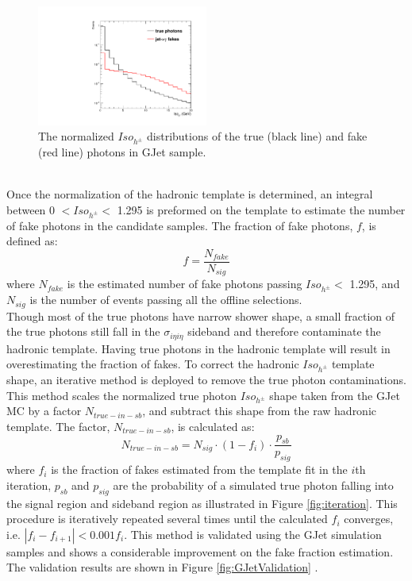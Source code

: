 \documentclass[thesis.tex]{subfiles}
\renewcommand\_{\textunderscore\allowbreak}
\begin{document}
\begin{figure}
  \centering
    \includegraphics[width=0.5\textwidth]{Figures/PLOT_JetPhoTemplate.pdf}
  \caption{The normalized $Iso_{h^\pm}$ distributions of the true (black line) and fake (red line) photons in GJet sample.}
    \label{fig:fakeinGJet}
\end{figure}
\\

Once the normalization of the hadronic template is determined, an integral between 0 $< Iso_{h^\pm} <$ 1.295 is preformed on the template to estimate the number of fake photons in the candidate samples. The fraction of fake photons, $f$, is defined as: 
\begin{equation}
		f = \frac{N_{fake}}{N_{sig}}
\end{equation}
where $N_{fake}$ is the estimated number of fake photons passing $Iso_{h^\pm} < $ 1.295, and $N_{sig}$ is the number of events passing all the offline selections. \\

Though most of the true photons have narrow shower shape, a small fraction of the true photons still fall in the $\sigma_{i\eta i\eta}$ sideband and therefore contaminate the hadronic template. Having true photons in the hadronic template will result in overestimating the fraction of fakes. To correct the hadronic $Iso_{h^\pm}$ template shape, an iterative method is deployed to remove the true photon contaminations.\\

This method scales the normalized true photon $Iso_{h^\pm}$ shape taken from the GJet MC by a factor $N_{true-in-sb}$, and subtract this shape from the raw hadronic template. The factor, $N_{true-in-sb}$,  is calculated as:
\begin{equation}
		N_{true-in-sb} = N_{sig} \cdot (1-f_i) \cdot \frac{p_{sb}}{p_{sig}}
\end{equation}
where $f_i$ is the fraction of fakes estimated from the template fit in the $i$th iteration, $p_{sb}$ and $p_{sig}$ are the probability of a simulated true photon falling into the signal region and sideband region as illustrated in Figure \ref{fig:iteration}. This procedure is iteratively repeated several times until the calculated $f_i$ converges, i.e. $|f_i - f_{i+1}| < 0.001f_i$. This method is validated using the GJet simulation samples and shows a considerable improvement on the fake fraction estimation. The validation results are shown in Figure \ref{fig:GJetValidation} .
\end{document}
